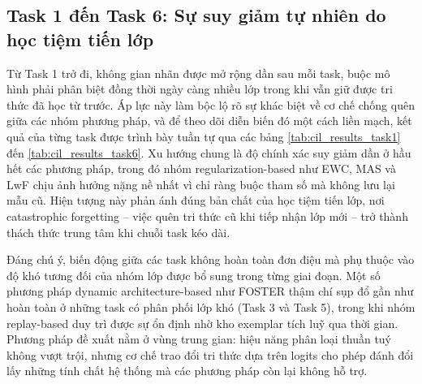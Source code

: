 \subsection{Task 1 đến Task 6: Sự suy giảm tự nhiên do học tiệm tiến lớp}

Từ Task 1 trở đi, không gian nhãn được mở rộng dần sau mỗi task, buộc mô hình phải phân biệt đồng thời ngày càng nhiều lớp trong khi vẫn giữ được tri thức đã học từ trước. Áp lực này làm bộc lộ rõ sự khác biệt về cơ chế chống quên giữa các nhóm phương pháp, và để theo dõi diễn biến đó một cách liền mạch, kết quả của từng task được trình bày tuần tự qua các bảng \ref{tab:cil_results_task1} đến \ref{tab:cil_results_task6}. Xu hướng chung là độ chính xác suy giảm dần ở hầu hết các phương pháp, trong đó nhóm regularization-based như EWC, MAS và LwF chịu ảnh hưởng nặng nề nhất vì chỉ ràng buộc tham số mà không lưu lại mẫu cũ. Hiện tượng này phản ánh đúng bản chất của học tiệm tiến lớp, nơi catastrophic forgetting -- việc quên tri thức cũ khi tiếp nhận lớp mới -- trở thành thách thức trung tâm khi chuỗi task kéo dài.

Đáng chú ý, biến động giữa các task không hoàn toàn đơn điệu mà phụ thuộc vào độ khó tương đối của nhóm lớp được bổ sung trong từng giai đoạn. Một số phương pháp dynamic architecture-based như FOSTER thậm chí sụp đổ gần như hoàn toàn ở những task có phân phối lớp khó (Task 3 và Task 5), trong khi nhóm replay-based duy trì được sự ổn định nhờ kho exemplar tích luỹ qua thời gian. Phương pháp đề xuất nằm ở vùng trung gian: hiệu năng phân loại thuần tuý không vượt trội, nhưng cơ chế trao đổi tri thức dựa trên logits cho phép đánh đổi lấy những tính chất hệ thống mà các phương pháp còn lại không hỗ trợ.

